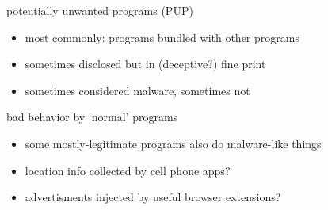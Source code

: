 \begin{frame}{potentially unwanted programs (PUP)}
    \begin{itemize}
    \item most commonly: programs bundled with other programs
    \item sometimes disclosed but in (deceptive?) fine print
    \item sometimes considered malware, sometimes not
    \end{itemize}
\end{frame}

\begin{frame}{bad behavior by `normal' programs}
    \begin{itemize}
    \item some mostly-legitimate programs also do malware-like things
    \vspace{.5cm}
    \item location info collected by cell phone apps?
    \item advertisments injected by useful browser extensions?
    \end{itemize}
\end{frame}


{ %
    \begin{frame}[plain]
    \end{frame}
}
